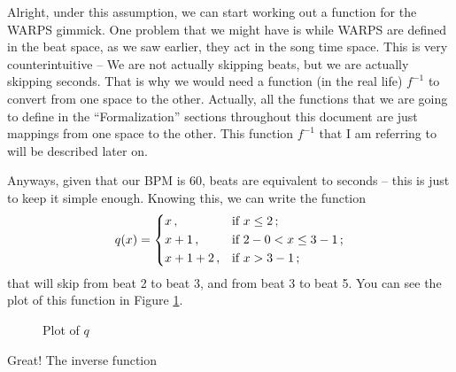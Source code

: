 \documentclass[a4paper,9pt]{article}
\begin{document}
    Alright, under this assumption, we can start working out a function for the WARPS gimmick. One problem that we might have is while  WARPS are defined in the beat space, as we saw earlier, they act in the song time space. This is very counterintuitive -- We are not actually skipping beats, but we are actually skipping seconds. That is why we would need a function (in the real life) $ f^{-1} $ to convert from one space to the other. Actually, all the functions that we are going to define in the ``Formalization'' sections throughout this document are just mappings from one space to the other. This function $ f^{-1} $ that I am referring to will be described later on.

    Anyways, given that our BPM is 60, beats are equivalent to seconds -- this is just to keep it simple enough. Knowing this, we can write the function 
    \begin{equation}
	    q(x) = \begin{dcases}
		    x\,, & \text{if $ x \leq 2 $}\,;\\
		    x+1\,, & \text{if $2-0 <  x \leq 3-1 $}\,;\\
		    x+1+2\,, & \text{if $ x > 3-1  $}\,;\\
	    \end{dcases}
    \end{equation}
    that will skip from beat 2 to beat 3, and from beat 3 to beat 5. You can see the plot of this function in Figure \ref{fig:wwarps}.
\begin{figure}[htpb]
	\centering

\caption{Plot of $q$ }
	\label{fig:wwarps}
\end{figure}

Great! The inverse function
\end{document}
